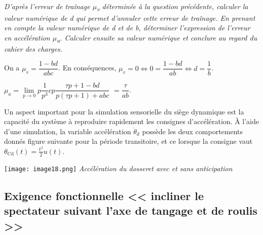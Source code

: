 \begin{multicols}{2}
\begin{corrige}
\end{corrige}
\else
\fi
  
\subparagraph{\label{q14}}\textit{D'après l'erreur de traînage $\mu$\emph{\textsubscript{v}} déterminée à
  la question précédente, calculer la valeur numérique de d qui permet
  d'annuler cette erreur de traînage. En prenant en compte la valeur
  numérique de d et de b, déterminer l'expression de l'erreur en
  accélération $\mu$\emph{\textsubscript{a}}. Calculer ensuite sa valeur
  numérique et conclure au regard du cahier des charges.}
\ifprof
\begin{corrige}
On a $\mu_v= \dfrac{1 -bd}{abc}$. En conséquences, $\mu_v=0 \Leftrightarrow  0=\dfrac{1 -bd}{ab} \Leftrightarrow d=\dfrac{1}{b}$.

$\mu_a=\lim\limits_{p\to0}  p\dfrac{1}{p^3}  cp \dfrac{\tau p + 1 -bd}{p\left(\tau p + 1 \right)+abc}$ 
$ =   \dfrac{\tau}{ab}$.

\end{corrige}
\else
\fi

\ifprof
\else

Un aspect important pour la simulation sensorielle du siège dynamique
est la capacité du système à reproduire rapidement les consignes
d'accélération. À l'aide d'une simulation, la variable accélération
\({\ddot{\theta}}_{d}\) possède les deux comportements donnés figure suivante
pour la période transitoire, et ce lorsque la consigne vaut
\(\theta_{\text{Cd}}\left( t \right) = \frac{t^{2}}{2}u(t)\).


\begin{center}
\texttt{[image: image18.png]}
\textit{Accélération du dosseret avec et sans anticipation \label{fig17}}
\end{center}
\fi

\ifprof
\begin{corrige}
\end{corrige}
\else
\fi


\subsection*{Exigence fonctionnelle << incliner le spectateur suivant l'axe de tangage et de roulis >>}
%


\end{multicols}
